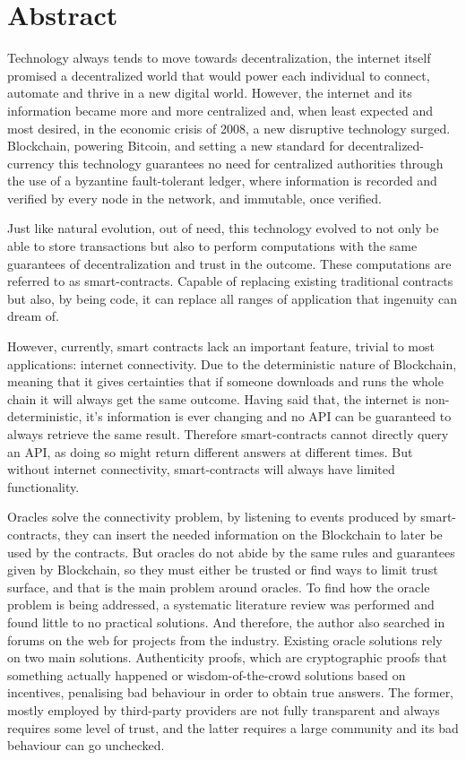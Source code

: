 \chapter*{Abstract}


Technology always tends to move towards decentralization, the internet itself promised a decentralized world that would power each individual to connect, automate and thrive in a new digital world. However, the internet and its information became more and more centralized and, when least expected and most desired, in the economic crisis of 2008, a new disruptive technology surged. Blockchain, powering Bitcoin, and setting a new standard for decentralized-currency this technology guarantees no need for centralized authorities through the use of a byzantine fault-tolerant ledger, where information is recorded and verified by every node in the network, and immutable, once verified.

Just like natural evolution, out of need, this technology evolved to not only be able to store transactions but also to perform computations with the same guarantees of decentralization and trust in the outcome. These computations are referred to as smart-contracts. Capable of replacing existing traditional contracts but also, by being code, it can replace all ranges of application that ingenuity can dream of.

However, currently, smart contracts lack an important feature, trivial to most applications: internet connectivity. Due to the deterministic nature of Blockchain, meaning that it gives certainties that if someone downloads and runs the whole chain it will always get the same outcome. Having said that, the internet is non-deterministic, it's information is ever changing and no API can be guaranteed to always retrieve the same result. Therefore smart-contracts cannot directly query an API, as doing so might return different answers at different times. But without internet connectivity, smart-contracts will always have limited functionality.

Oracles solve the connectivity problem, by listening to events produced by smart-contracts, they can insert the needed information on the Blockchain to later be used by the contracts. But oracles do not abide by the same rules and guarantees given by Blockchain, so they must either be trusted or find ways to limit trust surface, and that is the main problem around oracles. To find how the oracle problem is being addressed, a systematic literature review was performed and found little to no practical solutions. And therefore, the author also searched in forums on the web for projects from the industry. Existing oracle solutions rely on two main solutions. Authenticity proofs, which are cryptographic proofs that something actually happened or wisdom-of-the-crowd solutions based on incentives, penalising bad behaviour in order to obtain true answers. The former, mostly employed by third-party providers are not fully transparent and always requires some level of trust, and the latter requires a large community and its bad behaviour can go unchecked.

